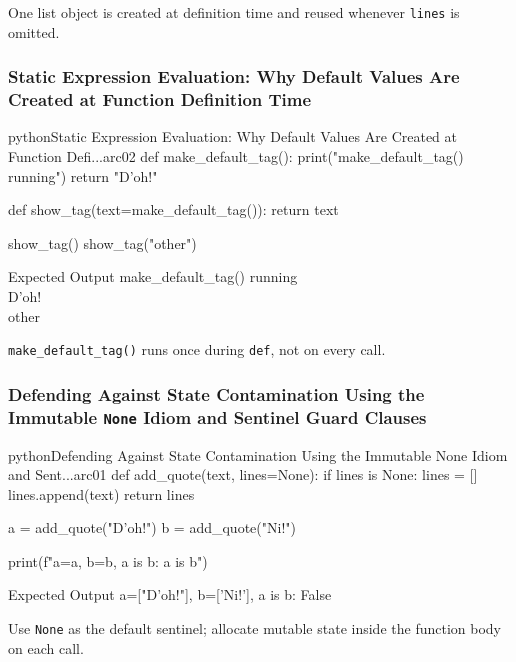 \documentclass[a4paper,twoside]{report}
\begin{document}
One list object is created at definition time and reused whenever \texttt{lines} is omitted.

\subsubsection{Static Expression Evaluation: Why Default Values Are Created at Function Definition Time}

\begin{codebox}[]{python}{Static Expression Evaluation: Why Default Values Are Created at Function Defi...}{arc02}
def make_default_tag():
    print("make_default_tag() running")
    return "D'oh!"

def show_tag(text=make_default_tag()):
    return text

show_tag()
show_tag("other")
\end{codebox}


\begin{iobox}{Expected Output}
make\_default\_tag() running \\
D'oh! \\
other \\
\end{iobox}




\texttt{make\_default\_tag()} runs once during \texttt{def}, not on every call.

\subsubsection{Defending Against State Contamination Using the Immutable \texttt{None} Idiom and Sentinel Guard Clauses}

\begin{codebox}[]{python}{Defending Against State Contamination Using the Immutable None Idiom and Sent...}{arc01}
def add_quote(text, lines=None):
    if lines is None:
        lines = []
    lines.append(text)
    return lines

a = add_quote("D'oh!")
b = add_quote("Ni!")

print(f"a={a}, b={b}, a is b: {a is b}")
\end{codebox}


\begin{iobox}{Expected Output}
a=["D'oh!"], b=['Ni!'], a is b: False \\
\end{iobox}




Use \texttt{None} as the default sentinel; allocate mutable state inside the function body on each call.
\end{document}
